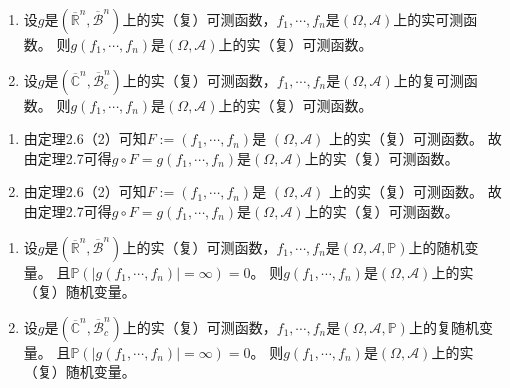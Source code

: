 \documentclass{ctexart}
\begin{document}
\begin{problem}\label{pro:2.5.2}
  \begin{enumerate}
    \item   设\(g \)是\((\overline{\mathbb{R}}^n,\overline{\mathcal{B}}^n) \)上的实（复）可测函数，\(f_1,\cdots,f_n \)是\((\Omega,\mathcal{A}) \)上的实可测函数。
      则\(g(f_1,\cdots,f_n) \)是\((\Omega,\mathcal{A}) \)上的实（复）可测函数。
    \item   设\(g \)是\((\overline{\mathbb{C}}^n,\overline{\mathcal{B}}^n_c) \)上的实（复）可测函数，\(f_1,\cdots,f_n \)是\((\Omega,\mathcal{A}) \)上的复可测函数。
      则\(g(f_1,\cdots,f_n) \)是\((\Omega,\mathcal{A}) \)上的实（复）可测函数。
  \end{enumerate}
\end{problem}
\begin{solution}
  \begin{enumerate}
    \item
      由定理2.6（2）可知\(F:=(f_1,\cdots,f_n) \)是{ \((\Omega,\mathcal{A}) \) }上的{实（复）可测函数}。
      故由定理2.7可得\(g \circ F=g(f_1,\cdots,f_n) \)是\((\Omega,\mathcal{A}) \)上的{实（复）可测函数}。
    \item
      由定理2.6（2）可知\(F:=(f_1,\cdots,f_n) \)是{ \((\Omega,\mathcal{A}) \) }上的{实（复）可测函数}。
      故由定理2.7可得\(g \circ F=g(f_1,\cdots,f_n) \)是\((\Omega,\mathcal{A}) \)上的{实（复）可测函数}。
  \end{enumerate}

\end{solution}

\begin{problem}\label{pro:2.5.3}
  \begin{enumerate}
    \item   设\(g \)是\((\overline{\mathbb{R}}^n,\overline{\mathcal{B}}^n) \)上的实（复）可测函数，\(f_1,\cdots,f_n \)是\((\Omega,\mathcal{A},\mathbb{P}) \)上的随机变量。
      且\(\mathbb{P}(|g(f_1,\cdots,f_n)|=\infty)=0 \)。 则\(g(f_1,\cdots,f_n) \)是\((\Omega,\mathcal{A}) \)上的实（复）随机变量。
    \item   设\(g \)是\((\overline{\mathbb{C}}^n,\overline{\mathcal{B}}^n_c) \)上的实（复）可测函数，\(f_1,\cdots,f_n \)是\((\Omega,\mathcal{A},\mathbb{P}) \)上的复随机变量。
      且\(\mathbb{P}(|g(f_1,\cdots,f_n)|=\infty)=0 \)。 则\(g(f_1,\cdots,f_n) \)是\((\Omega,\mathcal{A}) \)上的实（复）随机变量。
  \end{enumerate}
\end{problem}
\end{document}
